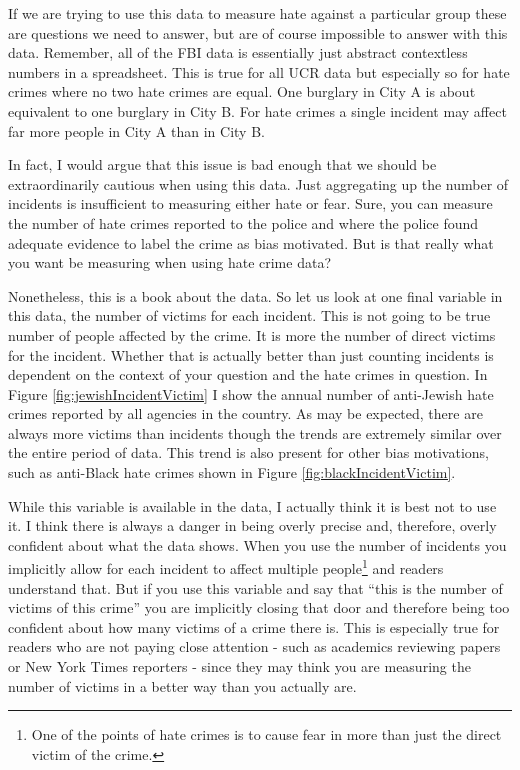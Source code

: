 \documentclass[
]{krantz}
\begin{document}
If we are trying to use this data to measure hate against a
particular group these are questions we need to answer, but
are of course impossible to answer with this data. Remember,
all of the FBI data is essentially just abstract contextless
numbers in a spreadsheet. This is true for all UCR data but
especially so for hate crimes where no two hate crimes are
equal. One burglary in City A is about equivalent to one
burglary in City B. For hate crimes a single incident may
affect far more people in City A than in City B.

In fact, I would argue that this issue is bad enough that we
should be extraordinarily cautious when using this data.
Just aggregating up the number of incidents is insufficient
to measuring either hate or fear. Sure, you can measure the
number of hate crimes reported to the police and where the
police found adequate evidence to label the crime as bias
motivated. But is that really what you want be measuring
when using hate crime data?

Nonetheless, this is a book about the data. So let us look
at one final variable in this data, the number of victims
for each incident. This is not going to be true number of
people affected by the crime. It is more the number of
direct victims for the incident. Whether that is actually
better than just counting incidents is dependent on the
context of your question and the hate crimes in question. In
Figure \ref{fig:jewishIncidentVictim} I show the annual
number of anti-Jewish hate crimes reported by all agencies
in the country. As may be expected, there are always more
victims than incidents though the trends are extremely
similar over the entire period of data. This trend is also
present for other bias motivations, such as anti-Black hate
crimes shown in Figure \ref{fig:blackIncidentVictim}.

While this variable is available in the data, I actually
think it is best not to use it. I think there is always a
danger in being overly precise and, therefore, overly
confident about what the data shows. When you use the number
of incidents you implicitly allow for each incident to
affect multiple people\footnote{One of the points of hate
  crimes is to cause fear in more than just the direct
  victim of the crime.} and readers understand that. But if
you use this variable and say that ``this is the number of
victims of this crime'' you are implicitly closing that door
and therefore being too confident about how many victims of
a crime there is. This is especially true for readers who
are not paying close attention - such as academics reviewing
papers or New York Times reporters - since they may think
you are measuring the number of victims in a better way than
you actually are.
\end{document}

